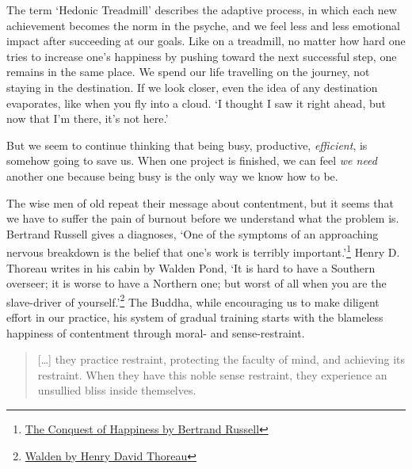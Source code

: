 The term `Hedonic Treadmill' describes the adaptive process, in which
each new achievement becomes the norm in the psyche, and we feel less
and less emotional impact after succeeding at our goals. Like on a
treadmill, no matter how hard one tries to increase one's happiness by
pushing toward the next successful step, one remains in the same place.
We spend our life travelling on the journey, not staying in the
destination. If we look closer, even the idea of any destination
evaporates, like when you fly into a cloud. `I thought I saw it right
ahead, but now that I'm there, it's not here.'

But we seem to continue thinking that being busy, productive,
\emph{efficient}, is somehow going to save us. When one project is
finished, we can feel \emph{we need} another one because being busy is
the only way we know how to be.

\enlargethispage*{\baselineskip}

The wise men of old repeat their message about contentment, but it seems
that we have to suffer the pain of burnout before we understand what the
problem is. Bertrand Russell gives a diagnoses, `One of the symptoms of
an approaching nervous breakdown is the belief that one's work is
terribly important.'\footnote{\href{https://www.goodreads.com/book/show/51783.The_Conquest_of_Happiness}{The
  Conquest of Happiness by Bertrand Russell}} Henry D. Thoreau writes in
his cabin by Walden Pond, `It is hard to have a Southern overseer; it is
worse to have a Northern one; but worst of all when you are the
slave-driver of yourself.'\footnote{\href{https://www.goodreads.com/book/show/16902.Walden}{Walden
  by Henry David Thoreau}} The Buddha, while encouraging us to make
diligent effort in our practice, his system of gradual training starts
with the blameless happiness of contentment through moral- and
sense-restraint.

\begin{quote}
{[}\ldots{]} they practice restraint, protecting the faculty of mind,
and achieving its restraint. When they have this noble sense restraint,
they experience an unsullied bliss inside themselves.

\bigskip

\end{quote}



